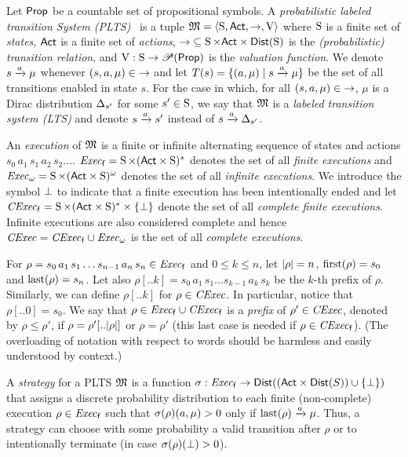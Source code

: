 Let $\Prop$ be a countable set of propositional symbols.
%
A \emph{probabilistic labeled transition System
(PLTS)}~\cite{Segala95} is a tuple $\model=\tup{\S,\Act,\ra,\V}$ where
$\S$ is a finite set of \emph{states}, $\Act$ is a finite set of
\emph{actions}, ${\ra}\subseteq {\S \times \Act \times \Dist(\S)}$ is
the \emph{(probabilistic) transition relation}, and
$\V:\S\to\powerset(\Prop)$ is the \emph{valuation function}.
%
We denote $s\reach{a}\mu$ whenever $(s,a,\mu)\in{\ra}$ and let
$T(s)=\{(a,\mu)\mid {s\reach{a}\mu}\}$ be the set of all transitions
enabled in state $s$.
%
For the case in which, for all $(s,a,\mu)\in{\ra}$, $\mu$ is a Dirac
distribution $\Dirac_{s'}$ for some $s'\in\S$, we say that $\model$ is
a \emph{labeled transition system (LTS)} and denote $s\reach{a}s'$
instead of $s\reach{a}\Dirac_{s'}$.


An \emph{execution} of $\model$ is a finite or infinite alternating
sequence of states and actions $s_0\, a_1\, s_1\, a_2\, s_2\ldots$.
$\execf= \S\times(\Act\times\S)^*$ denotes the set of all
\emph{finite executions} and $\execw= \S\times(\Act\times\S)^\omega$
denotes the set of all \emph{infinite executions}.
%
We introduce the symbol $\complete$ to indicate that a finite
execution has been intentionally ended and let $\cexecf=
\S\times(\Act\times\S)^*\times\{\complete\}$ denote the set of all
\emph{complete finite executions}.  Infinite executions are also
considered complete and hence $\cexec=\cexecf\cup\execw$ is the
set of all \emph{complete executions}.

For $\rho = s_0\, a_1\, s_1\ldots s_{n-1}\, a_n\, s_n \in \execf$ and
$0\leq k\leq n$, let $\size{\rho}=n$, $\first(\rho)=s_0$ and
$\last(\rho)=s_n$.
%
Let also $\rho[..k] = s_0\, a_1\, s_1\ldots s_{k-1}\, a_k\, s_k$ be
the $k$-th prefix of $\rho$.
%
Similarly, we can define $\rho[..k]$ for $\rho\in\cexec$.
In particular, notice that $\rho[..0]=s_0$.
%
We say that $\rho \in \execf\cup\cexecf$ is a \emph{prefix} of $\rho' \in \cexec$,
denoted by $\rho\leq\rho'$, if $\rho=\rho'[..\size{\rho}]$ or $\rho=\rho'$
(this last case is needed if $\rho\in\cexecf$).
%
(The overloading of notation with respect to words should be harmless
and easily understood by context.)

A \emph{strategy} for a PLTS $\model$ is a function $\strat:
\execf \to \Dist((\Act\times\Dist(S))\cup\{\complete\})$ that assigns
a discrete probability distribution to each finite (non-complete)
execution $\rho\in\execf$ such that $\strat(\rho)(a,\mu) > 0$ only
if $\last(\rho)\reach{a}\mu$.  Thus, a strategy can choose with some
probability a valid transition after $\rho$ or to intentionally
terminate (in case $\strat(\rho)(\complete)>0$).

